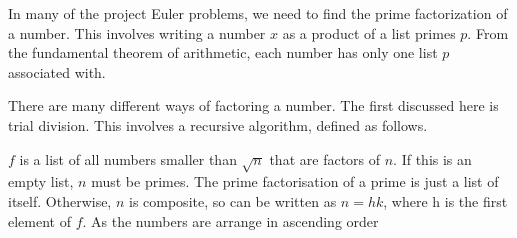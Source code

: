 In many of the project Euler problems, we need to find the prime factorization of a number. This involves writing a number $x$ as a product of a list primes $p$. From the fundamental theorem of arithmetic, each number has only one list $p$ associated with. 

There are many different ways of factoring a number. The first discussed here is trial division. This involves a recursive algorithm, defined as follows.



$f$ is a list of all numbers smaller than $\sqrt{n}$ that are factors of $n$. If this is an empty list, $n$ must be primes. The prime factorisation of a prime is just a list of itself. Otherwise, $n$ is composite, so can be written as $n = hk$, where h is the first element of $f$. As the numbers are arrange in ascending order 
